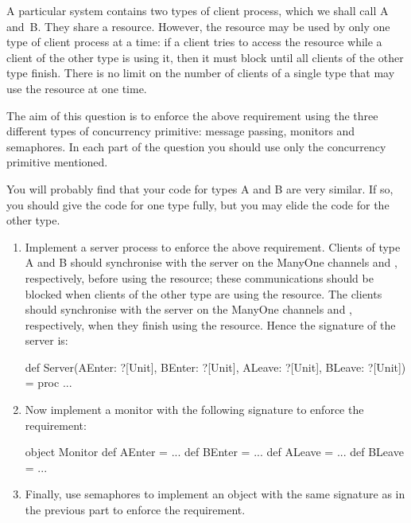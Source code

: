 \begin{question}
A particular system contains two types of client process, which we shall call
A and~B.  They share a resource.  However, the resource may be used by only
one type of client process at a time: if a client tries to access the
resource while a client of the other type is using it, then it must block
until all clients of the other type finish.  There is no limit on the number
of clients of a single type that may use the resource at one time.

The aim of this question is to enforce the above requirement using the three
different types of concurrency primitive: message passing, monitors and
semaphores.  In each part of the question you should use only the concurrency
primitive mentioned.

You will probably find that your code for types A and B are very similar.  If
so, you should give the code for one type fully, but you may elide the code
for the other type.


\begin{enumerate}
\item
Implement a server process to enforce the above requirement.  Clients of type
A and B should synchronise with the server on the ManyOne channels
 and , respectively, before using the resource;
these communications should be blocked when clients of the other type are
using the resource.  The clients should synchronise with the server on the
ManyOne channels  and , respectively, when they
finish using the resource.  Hence the signature of the server is:
%
\begin{scala}
def Server(AEnter: ?[Unit], BEnter: ?[Unit], 
           ALeave: ?[Unit], BLeave: ?[Unit]) = proc{ ... }
\end{scala}


\item
Now implement a monitor with the following signature to enforce the
requirement:
%
\begin{scala}
object Monitor{
  def AEnter = ...
  def BEnter = ...
  def ALeave = ...
  def BLeave = ...
}
\end{scala}

\item
Finally, use semaphores to implement an object with the same signature as in
the previous part to enforce the requirement.  
\end{enumerate}
\end{question}


